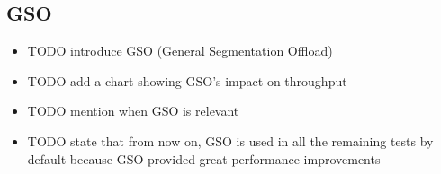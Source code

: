 \documentclass[12pt,a4paper,twoside,openright]{report}
\begin{document}
\subsection{GSO}
\begin{itemize}
  \item TODO introduce GSO (General Segmentation Offload)
  
  
  \item TODO add a chart showing GSO's impact on throughput
  
  
  \item TODO mention when GSO is relevant
  
  \item TODO state that from now on, GSO is used in all the remaining tests by default because GSO provided great performance improvements
\end{itemize}
\end{document}
